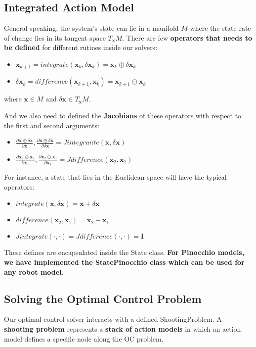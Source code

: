 \subsection{Integrated Action Model}
General speaking, the system's state can lie in a manifold $M$ where the state rate of change lies in its tangent space $T_\mathbf{x}M$. There are few \textbf{operators that needs to be defined} for different rutines inside our solvers:
\begin{itemize}
\item$\mathbf{x}_{k+1} = integrate(\mathbf{x}_k,\delta\mathbf{x}_k) = \mathbf{x}_k \oplus \delta\mathbf{x}_k$
\item$\delta\mathbf{x}_k = difference(\mathbf{x}_{k+1},\mathbf{x}_k) = \mathbf{x}_{k+1} \ominus \mathbf{x}_k$
\end{itemize}

where $\mathbf{x}\in M$ and $\delta\mathbf{x}\in T_\mathbf{x} M$.
 
And we also need to defined the \textbf{Jacobians} of these operators with respect to the first and second arguments:
\begin{itemize}
\item $\frac{\partial \mathbf{x}\oplus\delta\mathbf{x}}{\partial \mathbf{x}}, \frac{\partial \mathbf{x}\oplus\delta\mathbf{x}}{\partial\delta\mathbf{x}} =Jintegrante(\mathbf{x},\delta\mathbf{x})$
\item $\frac{\partial\mathbf{x}_2\ominus\mathbf{x}_2}{\partial \mathbf{x}_1}, \frac{\partial \mathbf{x}_2\ominus\mathbf{x}_1}{\partial\mathbf{x}_1} =Jdifference(\mathbf{x}_2,\mathbf{x}_1)$
\end{itemize}

For instance, a state that lies in the Euclidean space will have the typical operators:
\begin{itemize}
\item $integrate(\mathbf{x},\delta\mathbf{x}) = \mathbf{x} + \delta\mathbf{x}$
\item $difference(\mathbf{x}_2,\mathbf{x}_1) = \mathbf{x}_2 - \mathbf{x}_1$
\item $Jintegrate(\cdot,\cdot) = Jdifference(\cdot,\cdot) = \mathbf{I}$
\end{itemize}

These defines are encapsulated inside the State class. \textbf{For Pinocchio models, we have implemented the StatePinocchio class which can be used for any robot model.}

\subsection{Solving the Optimal Control Problem}
Our optimal control solver interacts with a defined ShootingProblem. A \textbf{shooting problem} represents a \textbf{stack of action models} in which an action model defines a specific node along the OC problem.

